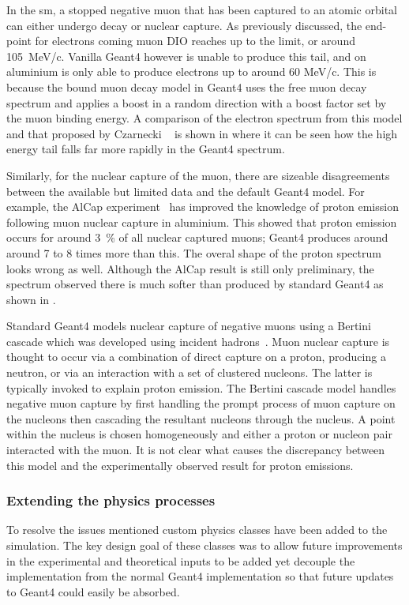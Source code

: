 In the \ac{sm}, a stopped negative muon that has been captured to an atomic orbital can either undergo decay or nuclear capture.
As previously discussed, the end-point for electrons coming muon \ac{DIO} reaches up to the \mueconv limit, or around 105~MeV/c.  
Vanilla Geant4 however is unable to produce this tail, and on aluminium is only able to produce electrons up to around 60 MeV/c.  
This is because the bound muon decay model in Geant4 uses the free muon decay spectrum and applies a boost in a random direction with a boost factor set by the muon binding energy.
A comparison of the electron spectrum from this model and that proposed by Czarnecki \etal~\cite{Czarnecki2011} is shown in  where it can be seen how the high energy tail falls far more rapidly in the Geant4 spectrum.

Similarly, for the nuclear capture of the muon, there are sizeable disagreements between the available but limited data and the default Geant4 model.
For example, the AlCap experiment~\cite{AlcapProposal2012} has improved the knowledge of proton emission following muon nuclear capture in aluminium.
This showed that proton emission occurs for around 3~\% of all nuclear captured muons; Geant4 produces around around 7 to 8 times more than this.
The overal shape of the proton spectrum looks wrong as well.  
Although the AlCap result is still only preliminary, the spectrum observed there is much softer than produced by standard Geant4 as shown in .

Standard Geant4 models nuclear capture of negative muons using a Bertini cascade which was developed using incident hadrons~\cite{Geant4:Bertini}.
Muon nuclear capture is thought to occur via a combination of direct capture on a proton, producing a neutron, or via an interaction with a set of clustered nucleons.
The latter is typically invoked to explain proton emission.
The Bertini cascade model handles negative muon capture by first handling the prompt process of muon capture on the nucleons then cascading the resultant nucleons through the nucleus.
A point within the nucleus is chosen homogeneously and either a proton or nucleon pair interacted with the muon.
It is not clear what causes the discrepancy between this model and the experimentally observed result for proton emissions.

\subsubsection{Extending the physics processes}
To resolve the issues mentioned custom physics classes have been added to the \COMET simulation.
The key design goal of these classes was to allow future improvements in the experimental and theoretical inputs to be added yet decouple the implementation from the normal Geant4 implementation so that future updates to Geant4 could easily be absorbed.

